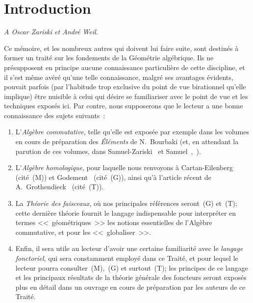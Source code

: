 \section*{Introduction}

\begin{center}
\emph{A Oscar Zariski et André Weil.}
\end{center}


Ce mémoire, et les nombreux autres qui doivent lui faire suite, sont destinés à former un traité sur les fondements de la Géométrie algébrique.
Ils ne présupposent en principe aucune connaissance particulière de cette discipline, et il s'est même avéré qu'une telle connaissance, malgré ses avantages évidents, pouvait parfois (par l'habitude trop exclusive du point de vue birationnel qu'elle implique) être nuisible à celui qui désire se familiariser avec le point de vue et les techniques exposés ici.
Par contre, nous supposerons que le lecteur a une bonne connaissance des sujets suivants~:

\begin{enumerate}
  \item[a)] L'\emph{Algèbre commutative}, telle qu'elle est exposée par exemple dans les volumes en cours de préparation des \emph{Éléments} de N.~Bourbaki (et, en attendant la parution de ces volumes, dans Samuel-Zariski~\cite{I-13} et Samuel~\cite{I-11},~\cite{I-12}).
  \item[b)] L'\emph{Algèbre homologique}, pour laquelle nous renvoyons à Cartan-Eilenberg~\cite{I-2} (cité~(M)) et Godement~\cite{I-4} (cité~(G)), ainsi qu'à l'article récent de A.~Grothendieck~\cite{I-6} (cité~(T)).
  \item[c)] La \emph{Théorie des faisceaux}, où nos principales références seront~(G) et~(T); cette dernière théorie fournit le langage indispensable pour interpréter en termes <<~géométriques~>> les notions essentielles de l'Algèbre commutative, et pour les <<~globaliser~>>.
  \item[d)] Enfin, il sera utile au lecteur d'avoir une certaine familiarité avec le \emph{langage fonctoriel}, qui sera constamment employé dans ce Traité, et pour lequel le lecteur pourra consulter~(M),~(G) et surtout~(T); les principes de ce langage et les principaux résultats de la théorie générale des foncteurs seront exposés plus en détail dans un ouvrage en cours de préparation par les auteurs de ce Traité.
\end{enumerate}

